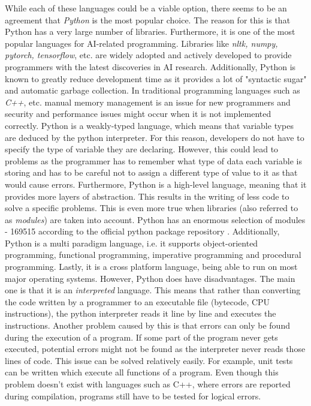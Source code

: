 \documentclass[12pt,a4paper]{article}
\begin{document}
While each of these languages could be a viable option, there seems to be an agreement that \textit{Python} is the most popular choice.  The reason for this is that Python has a very large number of libraries. Furthermore, it is one of the most popular languages for AI-related programming. Libraries like \textit{nltk, numpy, pytorch, tensorflow}, etc. are widely adopted and actively developed to provide programmers with the latest discoveries in AI research. Additionally, Python is known to greatly reduce development time as it provides a lot of "syntactic sugar" and automatic garbage collection. In traditional programming languages such as \textit{C++}, etc. manual memory management is an issue for new programmers and security and performance issues might occur when it is not implemented correctly. Python is a weakly-typed language, which means that variable types are deduced by the python interpreter. For this reason, developers do not have to specify the type of variable they are declaring. However, this could lead to problems as the programmer has to remember what type of data each variable is storing and has to be careful not to assign a different type of value to it as that would cause errors. Furthermore, Python is a high-level language, meaning that it provides more layers of abstraction. This results in the writing of less code to solve a specific problems. This is even more true when libraries (also referred to as \textit{modules}) are taken into account. Python has an enormous selection of modules - 169515 according to the official python package repository \cite{PyPI:online}. Additionally, Python is a multi paradigm language, i.e. it supports object-oriented programming, functional programming, imperative programming and procedural programming. Lastly, it is a cross platform language, being able to run on most major operating systems. However, Python does have disadvantages. The main one is that it is an \textit{interpreted} language. This means that rather than converting the code written by a programmer to an executable file (bytecode, CPU instructions), the python interpreter reads it line by line and executes the instructions. Another problem caused by this is that errors can only be found during the execution of a program. If some part of the program never gets executed, potential errors might not be found as the interpreter never reads those lines of code. This issue can be solved relatively easily. For example, unit tests can be written which execute all functions of a program. Even though this problem doesn't exist with languages such as C++, where errors are reported during compilation, programs still have to be tested for logical errors.
\end{document}
